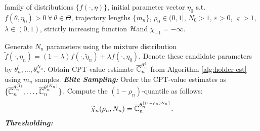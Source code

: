 \begin{algorithm}
\begin{algorithmic}
  family of distributions $\{f(\cdot,\eta)\}$, initial parameter vector $\eta_0$ s.t. $f(\theta,\eta_0)>0 ~\forall\, \theta\in \Theta$, trajectory lengths $\{m_n\}$, 
$\rho_0 \in (0,1]$, $N_0>1$,
$\varepsilon> 0$, $\varsigma>1$, $\lambda \in(0,1)$,
strictly increasing function
$\mathcal{H}\hspace*{-3pt}$ and $\chi_{-1}=-\infty$.

	    \State 
	    Generate $N_n$ parameters using the mixture distribution $\widetilde f(\cdot,\eta_n)= (1-\lambda)f(\cdot,\widetilde\eta_n)+\lambda f(\cdot,\eta_0)$. 
	    \State Denote these candidate parameters by $\theta^1_n, \ldots, \theta_n^{N_n}$.
	      \State Obtain CPT-value estimate $\overline {\mathbb{C}}_n^{\theta^i_n}$ from Algorithm \ref{alg:holder-est} using $m_n$ samples.
	      \EndFor
	  \State \textbf{\textit{Elite Sampling:}}
	  \State Order the CPT-value estimates as $\{\overline {\mathbb{C}}_n^{\theta^{(1)}_n},\ldots,\overline {\mathbb{C}}_n^{\theta^{(N_n)}_n}\}$. 
	  \State Compute the $(1-\rho_n)$-quantile as follows: 
	  \begin{align}
\widetilde \chi_{n}(\rho_n,N_n) = \overline {\mathbb{C}}_n^{\theta^{\lceil(1-\rho_n)N_n \rceil}_n}.\label{eq:quant}
\end{align}
		  \State \textbf{\textit{Thresholding:}}
	

\end{algorithmic}
\end{algorithm}
